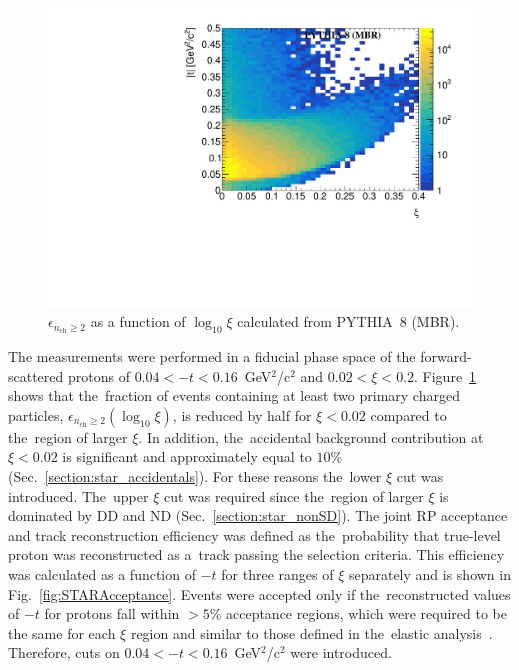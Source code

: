 \begin{figure}[b!]
	\centering
	\includegraphics[width=\textwidth, page=17]{chapters/dataSampleSTAR/img/true.pdf}
	\caption{$\epsilon_{ n_\textrm{ch} \geq 2}$ as a function of $\log_{10}\xi$ calculated from PYTHIA~8 (MBR).}
	\label{fig:STARtrueMCfiducial}
\end{figure}
The measurements were performed in a fiducial phase space of the forward-scattered protons of $0.04<-t<0.16$~GeV$^{2}$/c$^2$ and $0.02 < \xi<0.2$. Figure~\ref{fig:STARtrueMCfiducial} shows that the~fraction  of events containing at least two primary charged particles, $\epsilon_{n_\textrm{ch}\geq 2}(\log_{10}\xi)$,  is reduced by half for $\xi <0.02$ compared to the~region of larger $\xi$. In addition, the~accidental background contribution at $\xi<0.02$  is significant and  approximately equal to $10\%$ (Sec.~\ref{section:star_accidentals}). For these reasons the~lower $\xi$ cut was introduced.  The~upper $\xi$ cut was required since the~region of larger $\xi$ is dominated by \ac{DD} and \ac{ND} (Sec.~\ref{section:star_nonSD}). The joint RP  acceptance and track reconstruction efficiency was defined as the~probability that true-level proton was reconstructed as a~track passing the selection criteria. This efficiency was calculated as a function of $-t$ for three ranges of $\xi$ separately and is shown in Fig.~\ref{fig:STARAcceptance}. 
Events were accepted only if the~reconstructed values of $-t$ for protons fall within $>5\%$ acceptance regions, which were required to be the same for each $\xi$ region  and similar to those defined in the~elastic analysis~\cite{STARelastic2015}. Therefore,  cuts on $0.04 < -t < 0.16$~GeV$^2$/c$^2$ were introduced.
